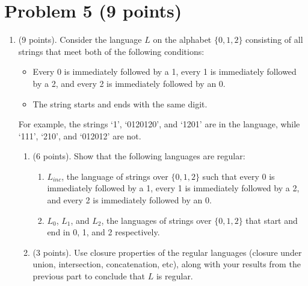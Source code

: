 \documentclass{../homework}
\begin{document}

\clearpage
\section{Problem 5 (9 points)}

\begin{enumerate}
    \item (9 points). Consider the language $L$ on the alphabet $\{0, 1, 2\}$ consisting of all strings that meet both of the following conditions:
    \begin{itemize}
        \item Every 0 is immediately followed by a 1, every 1 is immediately followed by a 2, and every 2 is immediately followed by an 0.
        \item The string starts and ends with the same digit.
    \end{itemize}
    For example, the strings `1', `0120120', and `1201' are in the language, while `111', `210', and `012012' are not.
    \begin{enumerate}
        \item (6 points). Show that the following languages are regular:
        \begin{enumerate}
            \item $L_{inc}$, the language of strings over $\{0,1,2\}$ such that every 0 is immediately followed by a 1, every 1 is immediately followed by a 2, and every 2 is immediately followed by an 0.
            
            \item $L_0$, $L_1$, and $L_2$, the languages of strings over $\{0, 1, 2\}$ that start and end in 0, 1, and 2 respectively.
            
        \end{enumerate}
        \item (3 points). Use closure properties of the regular languages (closure under union, intersection, concatenation, etc), along with your results from the previous part to conclude that $L$ is regular.
        
    \end{enumerate}
\end{enumerate}
\end{document}
